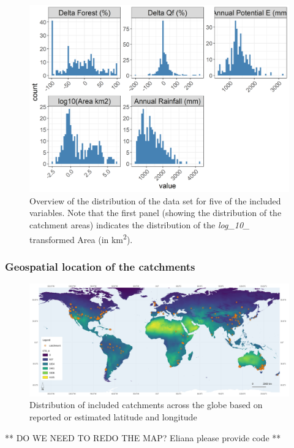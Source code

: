 \documentclass[]{elsarticle} %
\begin{document}
\begin{figure}
\includegraphics[width=0.9\linewidth]{./DataExploration} \caption{Overview of the distribution of the data set for five of the included variables. Note that the first panel (showing the distribution of the catchment areas) indicates the distribution of the \emph{log\_10\_} transformed Area (in km\textsuperscript{2}).}\label{fig:datagraphs}
\end{figure}

\hypertarget{geospatial-location-of-the-catchments}{%
\subsubsection{Geospatial location of the catchments}\label{geospatial-location-of-the-catchments}}

\begin{figure}
\includegraphics[width=0.9\linewidth]{FAOET0data_final_2022} \caption{Distribution of included catchments across the globe based on reported or estimated latitude and longitude}\label{fig:globalmap}
\end{figure}

** DO WE NEED TO REDO THE MAP? Eliana please provide code **
\end{document}
